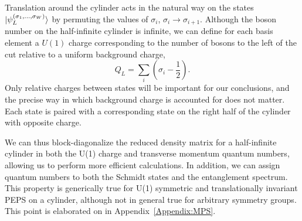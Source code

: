
Translation around the cylinder acts in the natural way on the states 
$\vert \psi_L^{(\sigma_1, \ldots, \sigma_W)} \rangle$ by permuting the values of 
$\sigma_i$, $\sigma_i \to \sigma_{i+1}$.
Although the boson number on the half-infinite cylinder is infinite, we can define for
each basis element a $U(1)$ charge corresponding to the number of bosons to the
left of the cut relative to a uniform background charge,
\begin{equation}
Q_L = \sum_i (\sigma_i - \frac12).
\end{equation}
Only relative charges between states will be important for our conclusions, and the precise
way in which background charge is accounted for does not matter.
Each state is paired with a corresponding state on the right half of the cylinder with opposite charge.

We can thus block-diagonalize the reduced density matrix
for a half-infinite cylinder in both the U(1) charge and transverse momentum
quantum numbers, allowing us to perform more efficient calculations. 
In addition, we can assign quantum numbers to both the Schmidt states and the entanglement
spectrum. This property is generically true for U(1) symmetric and translationally invariant PEPS
on a cylinder, although not in general true for arbitrary symmetry groups.
This point is elaborated on in Appendix~\ref{Appendix:MPS}.


